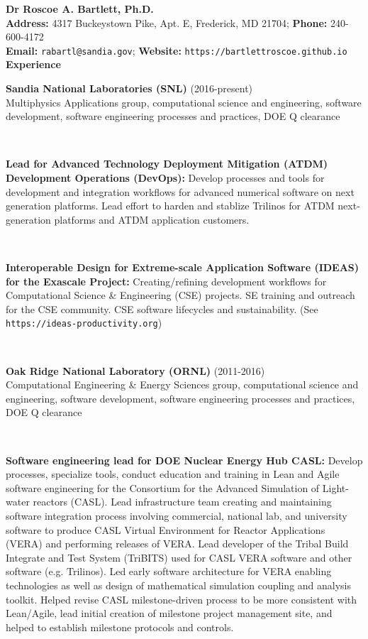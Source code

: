 \documentclass{report}
\newcommand{\itemvs}{1ex}
\newcommand{\sectitlevs}{1.2ex}
\newcommand{\indentone}{0.5in}
\newcommand{\widthone}{6.4in}
\newcommand{\pboxone}{\hspace*{\indentone}\parbox[t]{\widthone}}
\newcommand{\indenttwo}{0.75in}
\newcommand{\widthtwo}{6.15in}
\newcommand{\pboxtwo}{\hspace*{\indenttwo}\parbox[t]{\widthtwo}}
\begin{document}
%
\textbf{\LARGE Dr Roscoe A. Bartlett, Ph.D.} \\
\textbf{Address:} 4317 Buckeystown Pike, Apt. E, Frederick, MD 21704; \textbf{Phone:} 240-600-4172
\\
{}\textbf{Email:} {}\texttt{rabartl@sandia.gov};
{}\textbf{Website:} {}\texttt{https://bartlettroscoe.github.io}
%
%
\framebox[\textwidth]{}\\[2.0ex]
%
%
\textbf{\Large Experience}\\[\sectitlevs]
%
{}\pboxone{\textbf{Sandia National Laboratories (SNL)} (2016-present)\\
Multiphysics Applications group, computational science and engineering, software development, software engineering processes and practices, DOE Q clearance} \\[\itemvs]
%
{}\pboxtwo{\textbf{Lead for Advanced Technology Deployment Mitigation (ATDM) Development Operations (DevOps):}  Develop processes and tools for development and integration workflows for advanced numerical software on next generation platforms.  Lead effort to harden and stablize Trilinos for ATDM next-generation platforms and ATDM application customers.} \\[\itemvs]
%
{}\pboxtwo{\textbf{Interoperable Design for Extreme-scale Application Software (IDEAS) for the Exascale Project:} Creating/refining development workflows for Computational Science \& Engineering (CSE) projects. SE training and outreach for the CSE community. CSE software lifecycles and sustainability.  (See \texttt{https://ideas-productivity.org})}
\\[\itemvs]
%
%
{}\pboxone{\textbf{Oak Ridge National Laboratory (ORNL)} (2011-2016)\\
Computational Engineering \& Energy Sciences group, computational science and engineering, software development, software engineering processes and practices, DOE Q clearance} \\[\itemvs]
%
{}\pboxtwo{\textbf{Software engineering lead for DOE Nuclear Energy Hub CASL:} Develop processes, specialize tools, conduct education and training in Lean and Agile software engineering for the Consortium for the Advanced Simulation of Light-water reactors (CASL).  Lead infrastructure team creating and maintaining software integration process involving commercial, national lab, and university software to produce CASL Virtual Environment for Reactor Applications (VERA) and performing releases of VERA.  Lead developer of the Tribal Build Integrate and Test System (TriBITS) used for CASL VERA software and other software (e.g. Trilinos).  Led early software architecture for VERA enabling technologies as well as design of mathematical simulation coupling and analysis toolkit.  Helped revise CASL milestone-driven process to be more consistent with Lean/Agile, lead initial creation of milestone project management site, and helped to establish milestone protocols and controls.} \\[\itemvs]
\end{document}
